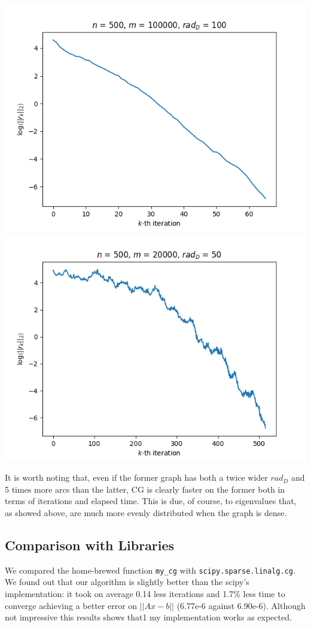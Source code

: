 \documentclass[12pt]{article}
\newcommand{\1}{\mathbbm{1}}
\begin{document}
{\includegraphics[scale=0.5, H]{my_cg-500-100000-100.png}
\includegraphics[scale=0.5, H]{my_cg-500-20000-50.png}

It is worth noting that, even if the former graph has both a twice wider $rad_D$ and 5 times more arcs than the latter, CG is clearly faster on the former both in terms of iterations and elapsed time. This is due, of course, to eigenvalues that, as showed above, are much more evenly distributed when the graph is dense. 

\subsection{Comparison with Libraries}
We compared the home-brewed function \texttt{my\_cg} with \texttt{scipy.sparse.linalg.cg}. We found out that our algorithm is slightly better than the scipy's implementation: it took on average 0.14 less iterations and 1.7\% less time to converge achieving a better error on $||Ax - b||$ (6.77e-6 against 6.90e-6). Although not impressive this results shows that1 my implementation works as  expected.

}
\end{document}
